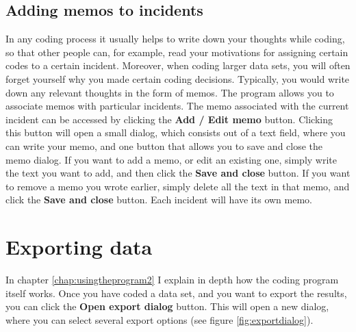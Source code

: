 \documentclass{memoir}
\begin{document}
\subsection{Adding memos to incidents}
\label{sec:memosincidents}

In any coding process it usually helps to write down your thoughts while coding, so that other people can, for example, read your motivations for assigning certain codes to a certain incident. Moreover, when coding larger data sets, you will often forget yourself why you made certain coding decisions. Typically, you would write down any relevant thoughts in the form of memos. The program allows you to associate memos with particular incidents. The memo associated with the current incident can be accessed by clicking the \textbf{Add / Edit memo} button. Clicking this button will open a small dialog, which consists out of a text field, where you can write your memo, and one button that allows you to save and close the memo dialog. If you want to add a memo, or edit an existing one, simply write the text you want to add, and then click the \textbf{Save and close} button. If you want to remove a memo you wrote earlier, simply delete all the text in that memo, and click the \textbf{Save and close} button. Each incident will have its own memo.

\section{Exporting data}
\label{sec:exportingdata}

In chapter \ref{chap:usingtheprogram2} I explain in depth how the coding program itself works. Once you have coded a data set, and you want to export the results, you can click the \textbf{Open export dialog} button. This will open a new dialog, where you can select several export options (see figure \ref{fig:exportdialog}).
\end{document}
